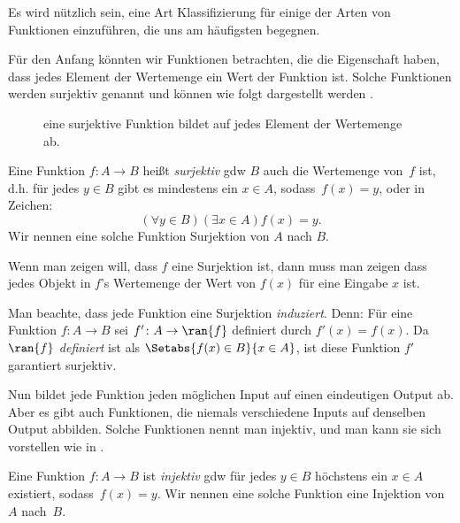 \documentclass[../../../include/open-logic-section]{subfiles}
\begin{document}

\begin{explain}
Es wird nützlich sein, eine Art Klassifizierung für einige der
Arten von Funktionen einzuführen, die uns am häufigsten begegnen. 

Für den Anfang könnten wir Funktionen betrachten, die die Eigenschaft haben,
dass jedes Element der Wertemenge ein Wert der Funktion ist. Solche
Funktionen werden surjektiv genannt und können wie folgt dargestellt werden
.

\begin{figure}
  \caption{eine surjektive Funktion bildet auf jedes Element der
    Wertemenge ab.}
\end{figure}
\end{explain}

\begin{defn}
Eine Funktion $f \colon {A \rightarrow B}$ heißt \emph{surjektiv} gdw $B$
auch die Wertemenge von~$f$ ist, d.h. für jedes $y \in B$ gibt es mindestens
ein $x \in A$, sodass~$f(x) = y$, oder in Zeichen:
\[
  (\forall y \in B)(\exists x \in A)f(x) = y.
\]
Wir nennen eine solche Funktion Surjektion von $A$ nach $B$.
\end{defn}

\begin{explain}
Wenn man zeigen will, dass $f$ eine Surjektion ist, dann muss man zeigen
dass jedes Objekt in $f$'s Wertemenge der Wert von $f(x)$ für eine
Eingabe $x$ ist.

Man beachte, dass jede Funktion eine Surjektion \emph{induziert}. Denn:
Für eine Funktion $f \colon A \to B$ sei $f' \colon A \to \ran{f}$
definiert durch $f'(x) = f(x)$. Da $\ran{f}$ \emph{definiert} ist als
$\Setabs{f(x) \in B}{x \in A}$, ist diese Funktion $f'$ garantiert
surjektiv.
\end{explain}

\begin{explain}
Nun bildet jede Funktion jeden möglichen Input auf einen eindeutigen Output ab. Aber
es gibt auch Funktionen, die niemals verschiedene Inputs auf denselben Output abbilden.
Solche Funktionen nennt man injektiv, und man kann sie sich vorstellen
wie in .
\end{explain}

\begin{defn} 
Eine Funktion $f \colon A \rightarrow B$ ist \emph{injektiv} gdw für
jedes $y \in B$ höchstens ein $x \in A$ existiert, sodass~$f(x) = y$. Wir
nennen eine solche Funktion eine Injektion von $A$ nach~$B$.
\end{defn}
\end{document}
